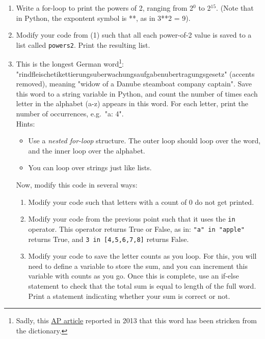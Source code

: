 \documentclass{article}[12pt]
\newcommand{\code}[1]{\texttt{#1}}  %
\begin{document}
\begin{enumerate}[itemsep=5ex]
	\item Write a for-loop to print the powers of 2, ranging from 2$^0$ to 2$^{15}$. (Note that in Python, the expontent symbol is **, as in 3**2 = 9). 
	
	\item Modify your code from (1) such that all each power-of-2 value is saved to a list called \code{powers2}. Print the resulting list. 

	
	\item This is the longest German word\footnote{Sadly, this \href{http://www.salon.com/2013/06/03/law_change_spells_end_for_germanys_longest_word_ap/}{AP article} reported in 2013 that this word has been stricken from the dictionary.}: "rindfleischetikettierungsuberwachungsaufgabenubertragungsgesetz" (accents removed), meaning "widow of a Danube steamboat company captain". Save this word to a string variable in Python, and count the number of times each letter in the alphabet (a-z) appears in this word. For each letter, print the number of occurrences, e.g.\ "a: 4". 
	\\ Hints:
	\begin{itemize}
		\item Use a \emph{nested for-loop} structure. The outer loop should loop over the word, and the inner loop over the alphabet.		\item You can loop over strings just like lists.
	\end{itemize} 
	Now, modify this code in several ways:
	\begin{enumerate}[itemsep=2ex]
		\item Modify your code such that letters with a count of 0 do not get printed. 
		\item Modify your code from the previous point such that it uses the \code{in} operator. This operator returns True or False, as in: \code{"a" in "apple"} returns True, and \code{3 in [4,5,6,7,8]} returns False.
		\item Modify your code to save the letter counts as you loop. For this, you will need to define a variable to store the sum, and you can increment this variable with counts as you go. Once this is complete, use an if-else statement to check that the total sum is equal to length of the full word. Print a statement indicating whether your sum is correct or not.
	\end{enumerate}
	

\end{enumerate}
\end{document}
